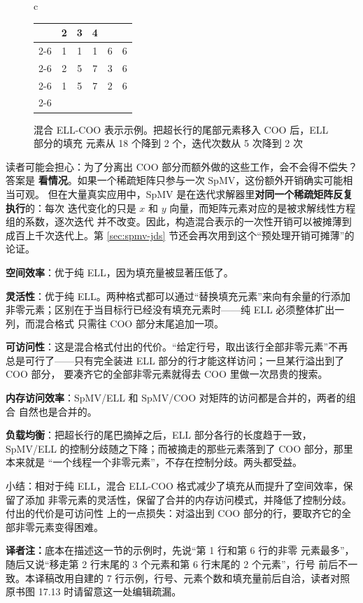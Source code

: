 \begin{figure}[htbp]
\begin{tabular}{c}
\begin{tabular}{r|c|c|c|c|c|}
      & \multicolumn{1}{c}{2} & \multicolumn{1}{c}{3} & \multicolumn{1}{c}{4}\\
    \cline{2-6}
    \code{rowIdx} & 1 & 1 & 1 & 6 & 6\\
    \cline{2-6}
    \code{colIdx} & 2 & 5 & 7 & 3 & 6\\
    \cline{2-6}
    \code{value}  & 1 & 5 & 7 & 2 & 6\\
    \cline{2-6}
  \end{tabular}
  \end{tabular}
  \caption{混合 ELL-COO 表示示例。把超长行的尾部元素移入 COO 后，ELL 部分的填充
  元素从 18 个降到 2 个，迭代次数从 5 次降到 2 次}
  \label{fig:17-13}
\end{figure}

读者可能会担心：为了分离出 COO 部分而额外做的这些工作，会不会得不偿失？答案是
\textbf{看情况}。如果一个稀疏矩阵只参与一次 SpMV，这份额外开销确实可能相当可观。
但在大量真实应用中，SpMV 是在迭代求解器里\textbf{对同一个稀疏矩阵反复执行}的：每次
迭代变化的只是 $x$ 和 $y$ 向量，而矩阵元素对应的是被求解线性方程组的系数，逐次迭代
并不改变。因此，构造混合表示的一次性开销可以被摊薄到成百上千次迭代上。第
\ref{sec:spmv-jds} 节还会再次用到这个“预处理开销可摊薄”的论证。

\textbf{空间效率}：优于纯 ELL，因为填充量被显著压低了。

\textbf{灵活性}：优于纯 ELL。两种格式都可以通过“替换填充元素”来向有余量的行添加
非零元素；区别在于当目标行已经没有填充元素时——纯 ELL 必须整体扩出一列，而混合格式
只需往 COO 部分末尾追加一项。

\textbf{可访问性}：这是混合格式付出的代价。“给定行号，取出该行全部非零元素”不再
总是可行了——只有完全装进 ELL 部分的行才能这样访问；一旦某行溢出到了 COO 部分，
要凑齐它的全部非零元素就得去 COO 里做一次昂贵的搜索。

\textbf{内存访问效率}：SpMV/ELL 和 SpMV/COO 对矩阵的访问都是合并的，两者的组合
自然也是合并的。

\textbf{负载均衡}：把超长行的尾巴摘掉之后，ELL 部分各行的长度趋于一致，
SpMV/ELL 的控制分歧随之下降；而被摘走的那些元素落到了 COO 部分，那里本来就是
“一个线程一个非零元素”，不存在控制分歧。两头都受益。

小结：相对于纯 ELL，混合 ELL-COO 格式减少了填充从而提升了空间效率，保留了添加
非零元素的灵活性，保留了合并的内存访问模式，并降低了控制分歧。付出的代价是可访问性
上的一点损失：对溢出到 COO 部分的行，要取齐它的全部非零元素变得困难。

\noindent\textbf{译者注：}底本在描述这一节的示例时，先说“第 1 行和第 6 行的非零
元素最多”，随后又说“移走第 2 行末尾的 3 个元素和第 6 行末尾的 2 个元素”，行号
前后不一致。本译稿改用自建的 7 行示例，行号、元素个数和填充量前后自洽，读者对照
原书图 17.13 时请留意这一处编辑疏漏。

